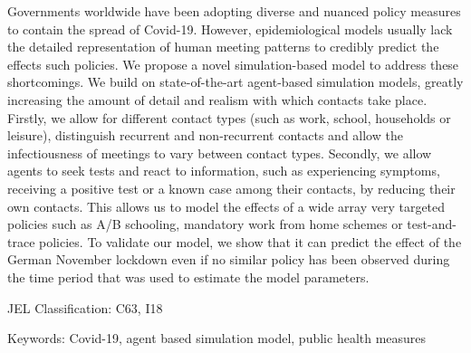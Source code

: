 \noindent
Governments worldwide have been adopting diverse and nuanced policy measures
to contain the spread of Covid-19.
However, epidemiological models usually lack the detailed representation of
human meeting patterns to credibly predict the effects such policies.
%
We propose a novel simulation-based model to address these shortcomings.
We build on state-of-the-art agent-based simulation models, greatly increasing
the amount of detail and realism with which contacts take place.
Firstly, we allow for different contact types (such as work, school, households
or leisure), distinguish recurrent and non-recurrent contacts and allow the
infectiousness of meetings to vary between contact types.
Secondly, we allow agents to seek tests and react to information, such as
experiencing symptoms, receiving a positive test or a known case among their
contacts, by reducing their own contacts.
This allows us to model the effects of a wide array very targeted policies such
as A/B schooling, mandatory work from home schemes or test-and-trace policies.
To validate our model, we show that it can predict the effect of the German
November lockdown even if no similar policy has been observed during the time
period that was used to estimate the model parameters.


\vspace{1cm}
\noindent JEL Classification: C63, I18

\noindent Keywords: Covid-19, agent based simulation model, public health measures

